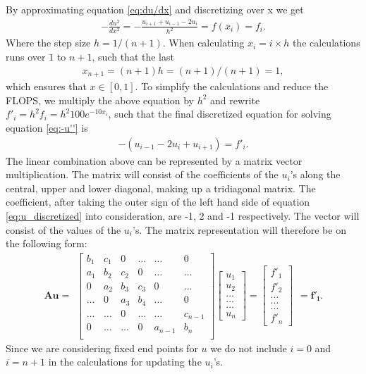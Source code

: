 \documentclass{emulateapj}
\begin{document}
By approximating equation \eqref{eq:du/dx} and discretizing over x we get
%
\begin{gather*}
    -\frac{du^2}{dx^2} = -\frac{u_{i+1} + u_{i-1} - 2u_i}{h^2} = f(x_i) = f_i.
\end{gather*}
%
Where the step size $h = 1/(n+1)$. When calculating $x_i = i\times h$ the calculations runs over $1$ to $n+1$, such that the last
%
\begin{gather}
    x_{n+1} = (n+1)h = (n+1)/(n+1) = 1,
\end{gather}
%
which ensures that $x \in [0,1]$. To simplify the calculations and reduce the FLOPS, we multiply the above equation by $h^2$ and rewrite $f'_i = h^2f_i = h^2 100 e^{-10x_i}$, such that the final discretized equation for solving equation \eqref{eq:-u''} is
%
\begin{gather}\label{eq:u_discretized}
    -\left(u_{i-1} - 2u_i + u_{i+1}\right) = f'_i.
\end{gather}
%
The linear combination above can be represented by a matrix vector multiplication. The matrix will consist of the coefficients of the $u_i$'s along the central, upper and lower diagonal, making up a tridiagonal matrix. The coefficient, after taking the outer sign of the left hand side of equation \eqref{eq:u_discretized} into consideration, are -1, 2 and -1 respectively. The vector will consist of the values of the $u_i$'s. The matrix representation will therefore be on the following form:
%
\[ \boldsymbol{Au} =
\begin{array}{c}
\begin{bmatrix}\label{eq:Au=f}
b_1     & c_1           & 0         & \dots     & \dots     & 0 \\
a_1     & b_2           & c_2       & 0         & \dots     & \dots \\
0       & a_2           & b_3       & c_3       & 0     & \dots\\
\dots  &  0            & a_3       & b_4       & \dots    & 0 \\
\dots  & \dots        & 0 & \dots    & \dots    & c_{n-1} \\
0       & \dots         & \dots         & 0         & a_{n-1}   & b_n   \\
\end{bmatrix}
\begin{bmatrix}
u_1 \\
u_2 \\
\dots \\
\dots \\
\dots \\
u_n
\end{bmatrix}
=
\begin{bmatrix}
f'_1 \\
f'_2 \\
\dots \\
\dots \\
\dots \\
f'_n
\end{bmatrix}
\end{array}
= \boldsymbol{f'_i}.
\]
%
Since we are considering fixed end points for $u$ we do not include $i = 0$ and $i = n+1$ in the calculations for updating the $u_i$'s. 
\end{document}
